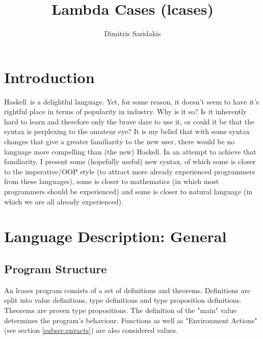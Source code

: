\documentclass{article}
\date{}
\author{
  Dimitris Saridakis
}
\def\H{Haskell}
\begin{document}
\title{
\textbf{Lambda Cases (lcases)}
}
\maketitle

\tableofcontents

\section{Introduction}

\H\ is a delightful language. Yet, for some reason, it doesn't seem to have
it's rightful place in terms of popularity in industry. Why is it so?  Is it
inherently hard to learn and therefore only the brave dare to use it, or could
it be that the syntax is perplexing to the amateur eye? It is my belief that
with some syntax changes that give a greater familiarity to the new user, there
would be no language more compelling than (the new) \H. In an attempt to
achieve that familiarity, I present some (hopefully useful) new syntax, of
which some is closer to the imperative/OOP style (to attract more already
experienced programmers from these languages), some is closer to mathematics
(in which most programmers should be experienced) and some is closer to natural
language (in which we are all already experienced). 

\section{Language Description: General}

\subsection{Program Structure}

An lcases program consists of a set of definitions and theorems.  Definitions
are split into value definitions, type definitions and type proposition
definitions. Theorems are proven type propositions.  The definition of the
"main" value determines the program's behaviour. Functions as well as
"Environment Actions" (see section \ref{subsec:envacts}) are also considered
values.
\end{document}

